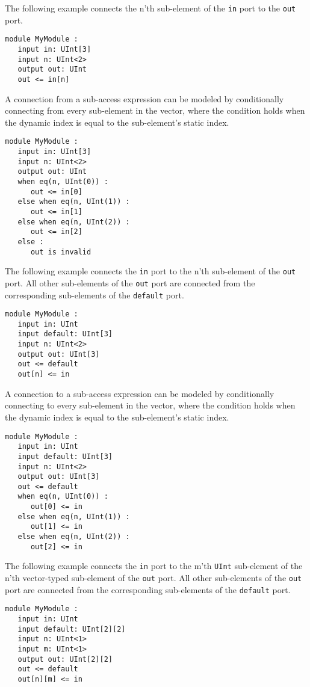 \documentclass[12pt]{article}
\begin{document}
The following example connects the n'th sub-element of the \verb|in| port to the \verb|out| port.
\begin{lstlisting}
module MyModule :
   input in: UInt[3]
   input n: UInt<2>
   output out: UInt
   out <= in[n]
\end{lstlisting}

A connection from a sub-access expression can be modeled by conditionally connecting from every sub-element in the vector, where the condition holds when the dynamic index is equal to the sub-element's static index.
\begin{lstlisting}
module MyModule :
   input in: UInt[3]
   input n: UInt<2>
   output out: UInt
   when eq(n, UInt(0)) :
      out <= in[0]
   else when eq(n, UInt(1)) :
      out <= in[1]
   else when eq(n, UInt(2)) :
      out <= in[2]
   else :
      out is invalid
\end{lstlisting}

The following example connects the \verb|in| port to the n'th sub-element of the \verb|out| port. All other sub-elements of the \verb|out| port are connected from the corresponding sub-elements of the \verb|default| port.
\begin{lstlisting}
module MyModule :
   input in: UInt
   input default: UInt[3]
   input n: UInt<2>
   output out: UInt[3]
   out <= default
   out[n] <= in
\end{lstlisting}

A connection to a sub-access expression can be modeled by conditionally connecting to every sub-element in the vector, where the condition holds when the dynamic index is equal to the sub-element's static index.
\begin{lstlisting}
module MyModule :
   input in: UInt
   input default: UInt[3]
   input n: UInt<2>
   output out: UInt[3]
   out <= default
   when eq(n, UInt(0)) :
      out[0] <= in
   else when eq(n, UInt(1)) :
      out[1] <= in
   else when eq(n, UInt(2)) :
      out[2] <= in
\end{lstlisting}

The following example connects the \verb|in| port to the m'th \verb|UInt| sub-element of the n'th vector-typed sub-element of the \verb|out| port. All other sub-elements of the \verb|out| port are connected from the corresponding sub-elements of the \verb|default| port.
\begin{lstlisting}
module MyModule :
   input in: UInt
   input default: UInt[2][2]
   input n: UInt<1>
   input m: UInt<1>
   output out: UInt[2][2]
   out <= default
   out[n][m] <= in
\end{lstlisting}
\end{document}
